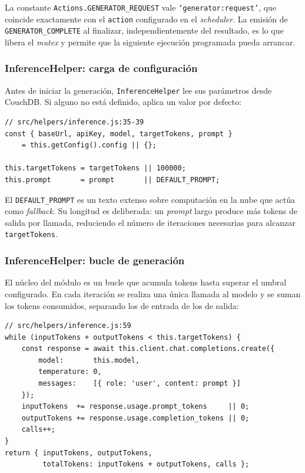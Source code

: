 La constante \texttt{Actions.GENERATOR\_REQUEST} vale \texttt{`generator:request'}, que coincide exactamente con el \texttt{action} configurado en el \textit{scheduler}. La emisión de \texttt{GENERATOR\_COMPLETE} al finalizar, independientemente del resultado, es lo que libera el \textit{mutex} y permite que la siguiente ejecución programada pueda arrancar.

\subsubsection{InferenceHelper: carga de configuración}

Antes de iniciar la generación, \texttt{InferenceHelper} lee sus parámetros desde CouchDB. Si alguno no está definido, aplica un valor por defecto:

\begin{lstlisting}[caption=Carga de parámetros de configuración en InferenceHelper, label=lst:inference-config]
// src/helpers/inference.js:35-39
const { baseUrl, apiKey, model, targetTokens, prompt }
    = this.getConfig().config || {};

this.targetTokens = targetTokens || 100000;
this.prompt       = prompt       || DEFAULT_PROMPT;
\end{lstlisting}

El \texttt{DEFAULT\_PROMPT} es un texto extenso sobre computación en la nube que actúa como \textit{fallback}. Su longitud es deliberada: un \textit{prompt} largo produce más tokens de salida por llamada, reduciendo el número de iteraciones necesarias para alcanzar \texttt{targetTokens}.

\subsubsection{InferenceHelper: bucle de generación}

El núcleo del módulo es un bucle que acumula tokens hasta superar el umbral configurado. En cada iteración se realiza una única llamada al modelo y se suman los tokens consumidos, separando los de entrada de los de salida:

\begin{lstlisting}[caption=Bucle de generación de tokens hasta alcanzar el objetivo, label=lst:inference-loop]
// src/helpers/inference.js:59
while (inputTokens + outputTokens < this.targetTokens) {
    const response = await this.client.chat.completions.create({
        model:       this.model,
        temperature: 0,
        messages:    [{ role: 'user', content: prompt }]
    });
    inputTokens  += response.usage.prompt_tokens     || 0;
    outputTokens += response.usage.completion_tokens || 0;
    calls++;
}
return { inputTokens, outputTokens,
         totalTokens: inputTokens + outputTokens, calls };
\end{lstlisting}


